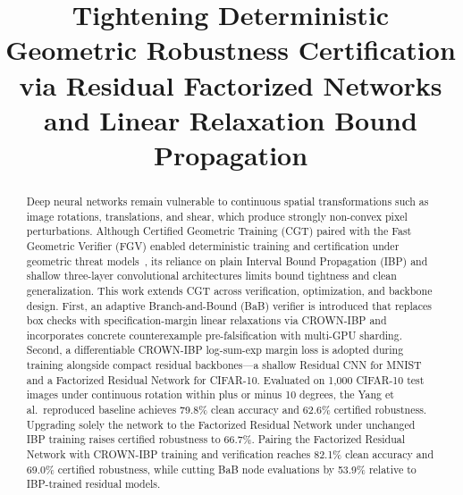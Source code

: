\documentclass[conference]{IEEEtran}
\begin{document}
\title{Tightening Deterministic Geometric Robustness Certification via
       Residual Factorized Networks and Linear Relaxation Bound Propagation}

\author{
\and
{}
\and
{}
}

\maketitle

\begin{abstract}
Deep neural networks remain vulnerable to continuous spatial transformations
such as image rotations, translations, and shear, which produce strongly
non-convex pixel perturbations.
Although Certified Geometric Training (CGT) paired with the Fast Geometric
Verifier (FGV) enabled deterministic training and certification under
geometric threat models~\cite{b3}, its reliance on plain Interval Bound
Propagation (IBP) and shallow three-layer convolutional architectures limits
bound tightness and clean generalization.
This work extends CGT across verification, optimization, and backbone design.
First, an adaptive Branch-and-Bound (BaB) verifier is introduced that replaces
box checks with specification-margin linear relaxations via CROWN-IBP and
incorporates concrete counterexample pre-falsification with multi-GPU sharding.
Second, a differentiable CROWN-IBP log-sum-exp margin loss is adopted during
training alongside compact residual backbones---a shallow Residual CNN for
MNIST and a Factorized Residual Network for CIFAR-10.
Evaluated on 1,000 CIFAR-10 test images under continuous rotation within
plus or minus 10 degrees, the Yang et al.\ reproduced baseline achieves
79.8\% clean accuracy and 62.6\% certified robustness.
Upgrading solely the network to the Factorized Residual Network under
unchanged IBP training raises certified robustness to 66.7\%.
Pairing the Factorized Residual Network with CROWN-IBP training and
verification reaches 82.1\% clean accuracy and 69.0\% certified robustness,
while cutting BaB node evaluations by 53.9\% relative to IBP-trained residual
models.
\end{abstract}
\end{document}
